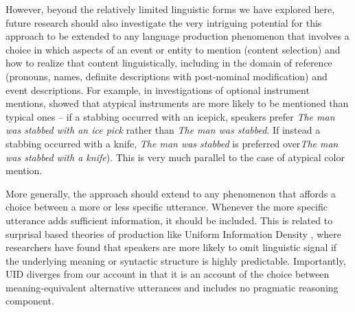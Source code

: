 \documentclass[11pt]{article}
\newcommand{\jd}[1]{\textcolor{Red}{[jd: #1]}}
\begin{document}
However, beyond the relatively limited linguistic forms we have explored here, future research should also investigate the very intriguing potential for this approach to be extended to any language production phenomenon that involves a choice in which aspects of an event or entity to mention (content selection) and how to realize that content linguistically, including in the domain of reference (pronouns, names, definite descriptions with post-nominal modification) and event descriptions. For example, in investigations of optional instrument mentions,  showed that atypical instruments are more likely to be mentioned than typical ones -- if a stabbing occurred with an icepick, speakers prefer \emph{The man was stabbed with an ice pick} rather than \emph{The man was stabbed}. If instead a stabbing occurred with a knife, \emph{The man was stabbed} is preferred over\emph{The man was stabbed with a knife}). This is very much parallel to the case of atypical color mention. %



More generally, the approach should extend to any  phenomenon that affords a choice between a more or less specific utterance. Whenever the more specific utterance adds sufficient information, it should be included. This is related to surprisal based theories of production like Uniform Information Density \cite<UID,>{jaeger2006, levy2007, frank2008, jaeger2010}, where researchers have found that speakers are more likely to omit linguistic signal if the underlying meaning or syntactic structure is highly predictable. Importantly, UID diverges from our account in that it is an account of the choice between meaning-equivalent alternative utterances and includes no pragmatic reasoning component. 


\end{document}
